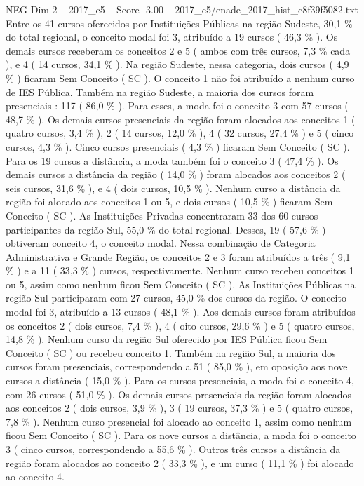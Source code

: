 \begin{textsample}{NEG Dim 2 – 2017\_c5 – Score -3.00 – 2017\_c5/enade\_2017\_hist\_c8f39f5082.txt}
Entre os 41 cursos oferecidos por Instituições Públicas na região Sudeste, 30,1 \% do total regional, o conceito modal foi 3, atribuído a 19 cursos ( 46,3 \% ).
Os demais cursos receberam os conceitos 2 e 5 ( ambos com três cursos, 7,3 \% cada ), e 4 ( 14 cursos, 34,1 \% ).
Na região Sudeste, nessa categoria, dois cursos ( 4,9 \% ) ficaram Sem Conceito ( SC ).
O conceito 1 não foi atribuído a nenhum curso de IES Pública.
Também na região Sudeste, a maioria dos cursos foram presenciais : 117 ( 86,0 \% ).
Para esses, a moda foi o conceito 3 com 57 cursos ( 48,7 \% ).
Os demais cursos presenciais da região foram alocados aos conceitos 1 ( quatro cursos, 3,4 \% ), 2 ( 14 cursos, 12,0 \% ), 4 ( 32 cursos, 27,4 \% ) e 5 ( cinco cursos, 4,3 \% ).
Cinco cursos presenciais ( 4,3 \% ) ficaram Sem Conceito ( SC ).
Para os 19 cursos a distância, a moda também foi o conceito 3 ( 47,4 \% ).
Os demais cursos a distância da região ( 14,0 \% ) foram alocados aos conceitos 2 ( seis cursos, 31,6 \% ), e 4 ( dois cursos, 10,5 \% ).
Nenhum curso a distância da região foi alocado aos conceitos 1 ou 5, e dois cursos ( 10,5 \% ) ficaram Sem Conceito ( SC ).
As Instituições Privadas concentraram 33 dos 60 cursos participantes da região Sul, 55,0 \% do total regional.
Desses, 19 ( 57,6 \% ) obtiveram conceito 4, o conceito modal.
Nessa combinação de Categoria Administrativa e Grande Região, os conceitos 2 e 3 foram atribuídos a três ( 9,1 \% ) e a 11 ( 33,3 \% ) cursos, respectivamente.
Nenhum curso recebeu conceitos 1 ou 5, assim como nenhum ficou Sem Conceito ( SC ).
As Instituições Públicas na região Sul participaram com 27 cursos, 45,0 \% dos cursos da região.
O conceito modal foi 3, atribuído a 13 cursos ( 48,1 \% ).
Aos demais cursos foram atribuídos os conceitos 2 ( dois cursos, 7,4 \% ), 4 ( oito cursos, 29,6 \% ) e 5 ( quatro cursos, 14,8 \% ).
Nenhum curso da região Sul oferecido por IES Pública ficou Sem Conceito ( SC ) ou recebeu conceito 1.
Também na região Sul, a maioria dos cursos foram presenciais, correspondendo a 51 ( 85,0 \% ), em oposição aos nove cursos a distância ( 15,0 \% ).
Para os cursos presenciais, a moda foi o conceito 4, com 26 cursos ( 51,0 \% ).
Os demais cursos presenciais da região foram alocados aos conceitos 2 ( dois cursos, 3,9 \% ), 3 ( 19 cursos, 37,3 \% ) e 5 ( quatro cursos, 7,8 \% ).
Nenhum curso presencial foi alocado ao conceito 1, assim como nenhum ficou Sem Conceito ( SC ).
Para os nove cursos a distância, a moda foi o conceito 3 ( cinco cursos, correspondendo a 55,6 \% ).
Outros três cursos a distância da região foram alocados ao conceito 2 ( 33,3 \% ), e um curso ( 11,1 \% ) foi alocado ao conceito 4.

\end{textsample}
